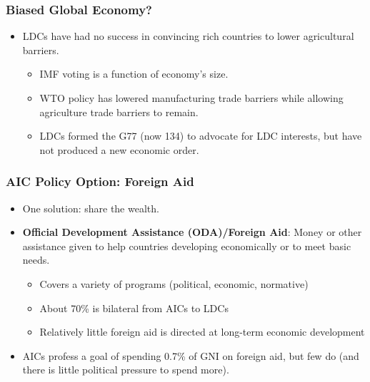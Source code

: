 \documentclass{beamer}
\begin{document}
\begin{frame} 
	\frametitle{\LARGE{Biased Global Economy?}}
	\begin{itemize}
		\item LDCs have had no success in convincing rich countries to lower agricultural barriers. \pause 
		\begin{itemize}
			\item IMF voting is a function of economy's size. \pause 
			\item WTO policy has lowered manufacturing trade barriers while allowing agriculture trade barriers to remain. \pause 
			\item LDCs formed the G77 (now 134) to advocate for LDC interests, but have not produced a new economic order.  
		\end{itemize}
	\end{itemize}
\end{frame}

\begin{frame} 
	\frametitle{\LARGE{AIC Policy Option: Foreign Aid}}
	\begin{itemize}
			\item One solution: share the wealth. \pause  
			\item \textbf{Official Development Assistance (ODA)/Foreign Aid}: Money or other assistance given to help countries developing economically or to meet basic needs. \pause 
			\begin{itemize}
			    \item Covers a variety of programs (political, economic, normative) \pause 
			    \item About 70\% is bilateral from AICs to LDCs \pause 
			    \item Relatively little foreign aid is directed at long-term economic development \pause 
			\end{itemize}
			\item AICs profess a goal of spending 0.7\% of GNI on foreign aid, but few do (and there is little political pressure to spend more).
	\end{itemize}
\end{frame}
\end{document}
